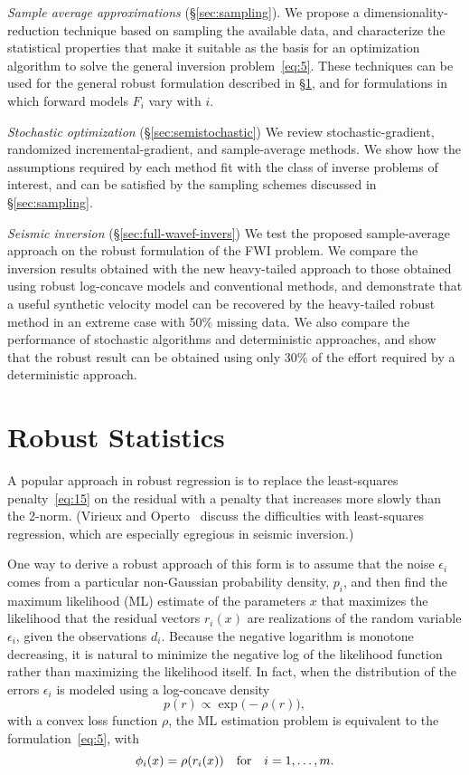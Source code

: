 \documentclass[nospthms]{svjour3}
\numberwithin{equation}{section}
\def\text #1{\hbox{\quad#1\quad}}
\begin{document}
{\it Sample average approximations} (\S\ref{sec:sampling}). We propose
a dimensionality-reduction technique based on sampling the available
data, and characterize the statistical properties that make it
suitable as the basis for an optimization algorithm to solve the
general inversion problem~\eqref{eq:5}. These techniques can be used
for the general robust formulation described in \S\ref{sec:mle}, and
for formulations in which forward models $F_i$ vary with $i$.

{\it Stochastic optimization} (\S\ref{sec:semistochastic}) We review
stochastic-gradient, randomized in\-cremental-gradient, and
sample-average methods. We show how the assumptions required by each
method fit with the class of inverse problems of interest, and can be
satisfied by the sampling schemes discussed in \S\ref{sec:sampling}.

{\it Seismic inversion} (\S\ref{sec:full-wavef-invers}) We test the
proposed sample-average approach on the robust formulation of the FWI
problem. We compare the inversion results obtained with the new
heavy-tailed approach to those obtained using robust log-concave
models and conventional methods, and demonstrate that a useful
synthetic velocity model can be recovered by the heavy-tailed robust
method in an extreme case with 50\% missing data.  We also compare the
performance of stochastic algorithms and deterministic approaches, and
show that the robust result can be obtained using only 30\% of the
effort required by a deterministic approach.


\section{Robust Statistics}
\label{sec:mle}

A popular approach in robust regression is to replace the
least-squares penalty~\eqref{eq:15} on the residual with a penalty
that increases more slowly than the 2-norm. (Virieux and
Operto~\cite{VirieuxOperto2009} discuss the difficulties with
least-squares regression, which are especially egregious in seismic
inversion.)


One way to derive a robust approach of this form is to assume that the
noise $\epsilon_i$ comes from a particular non-Gaussian probability
density, $p_i$, and then find the maximum likelihood (ML)
estimate of the parameters $x$ that maximizes the
likelihood that the residual vectors $r_i(x)$ are realizations of the
random variable $\epsilon_i$, given the observations $d_i$. Because
the negative logarithm is monotone decreasing, it is natural to
minimize the negative log of the likelihood function rather than
maximizing the likelihood itself. In fact, when the distribution of
the errors $\epsilon_i$ is modeled using a log-concave density \[p(r)
\propto \exp\big(-\rho(r)\big),\] with a convex loss function $\rho$,
the ML estimation problem is equivalent to the
formulation~\eqref{eq:5}, with
\begin{equation}\label{eq:18}
  \phi_i(x) = \rho(r_i(x))
  \text{for}
  i=1,\ldots,m.
\end{equation}
\end{document}
